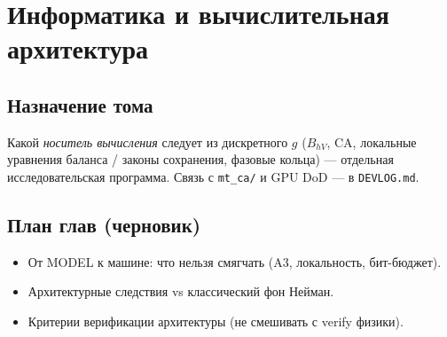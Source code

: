 \part{Информатика и вычислительная архитектура}

\chapter{Назначение тома}
Какой \emph{носитель вычисления} следует из дискретного $g$
($B_{hV}$, CA, локальные уравнения баланса / законы сохранения, фазовые кольца) --- отдельная исследовательская программа.
Связь с \texttt{mt\_ca/} и GPU DoD --- в \texttt{DEVLOG.md}.

\chapter{План глав (черновик)}
\begin{itemize}
  \item От MODEL к машине: что нельзя смягчать (A3, локальность, бит-бюджет).
  \item Архитектурные следствия vs классический фон Нейман.
  \item Критерии верификации архитектуры (не смешивать с verify физики).
\end{itemize}




